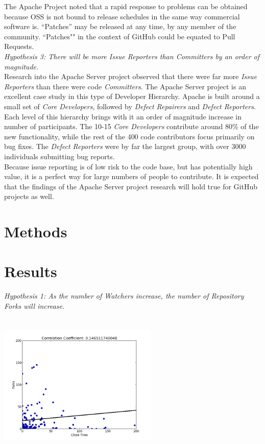 \documentclass{proc}
\begin{document}
The Apache Project noted that a rapid response to problems can be obtained because OSS is not bound to release schedules in the same way commercial software is. ``Patches'' may be released at any time, by any member of the community\cite{mockus2000case}. ``Patches"" in the context of GitHub could be equated to Pull Requests.\\

\emph{Hypothesis 3: There will be more Issue Reporters than Committers by an order of magnitude.}\\
Research into the Apache Server project observed that there were far more \emph{Issue Reporters} than there were code \emph{Committers}\cite{mockus2000case}. The Apache Server project is an excellent case study in this type of Developer Hierarchy. Apache is built around a small set of {\it Core Developers}, followed by {\it Defect Repairers} and {\it Defect Reporters}. Each level of this hierarchy brings with it an order of magnitude increase in number of participants. The 10-15 {\it Core Developers} contribute around 80\% of the new functionality, while the rest of the 400 code contributors focus primarily on bug fixes. The {\it Defect Reporters} were by far the largest group, with over 3000 individuals submitting bug reports.\\

Because issue reporting is of low risk to the code base, but has potentially high value, it is a perfect way for large numbers of people to contribute. It is expected that the findings of the Apache Server project research will hold true for GitHub projects as well.

\section{Methods}

\section{Results}
\emph{Hypothesis 1: As the number of Watchers increase, the number of Repository Forks will increase.}\\
\includegraphics[height=3in,width=3in]{images/issue_close_time_forks_scatterplot.png}
\end{document}
